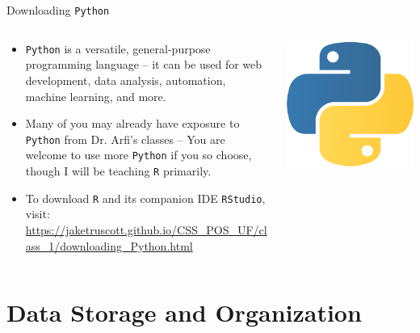 \documentclass[
  ignorenonframetext,
]{beamer}
\begin{document}
\begin{frame}{Downloading \texttt{Python}}
\label{downloading-3}
\begin{columns}[T] %
  \begin{column}{0.65\textwidth}
  \par \vspace{2.5mm}
  \begin{itemize}
  
  \item \texttt{Python} is a versatile, general-purpose programming language – it can be used for web development, data analysis, automation, machine learning, and more. \par \vspace{1.5mm}
  
  \item Many of you may already have exposure to \texttt{Python} from Dr. Arfi's classes -- You are welcome to use more \texttt{Python} if you so choose, though I will be teaching \texttt{R} primarily.  \par \vspace{1.5mm}
  
  \item To download \texttt{R} and its companion IDE \texttt{RStudio}, visit: \url{https://jaketruscott.github.io/CSS_POS_UF/class_1/downloading_Python.html} \par \vspace{1.5mm}

  
  \end{itemize}
  \end{column}

  \begin{column}{0.5\textwidth}
    \centering
    \vspace{2.5mm}
    \includegraphics[width=0.75\linewidth]{../../images/Python_logo.png}
    \vfill

  \end{column}
\end{columns}
\end{frame}

\section{Data Storage and
Organization}\label{data-storage-and-organization}
\end{document}

